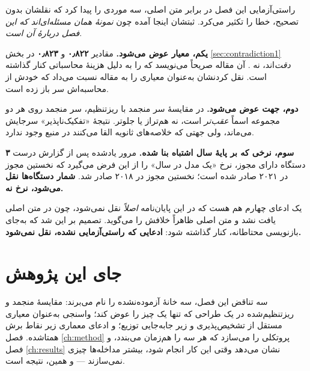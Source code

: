 راستی‌آزمایی این فصل در برابر متن اصلی، سه موردی را پیدا کرد که نقلشان بدون تصحیح، خطا را
تکثیر می‌کرد. ثبتشان اینجا آمده چون \emph{نمونهٔ همان مسئله‌ای‌اند که این فصل دربارهٔ آن است}.

\textbf{یکم، معیار عوض می‌شود.} مقادیر \textbf{\num{۰٫۸۲۲}} و \textbf{\num{۰٫۸۲۳}} در بخش
\ref{sec:contradiction1} \emph{دقت}‌اند، نه . آن مقاله صریحاً می‌نویسد که  را
به دلیل هزینهٔ محاسباتی کنار گذاشته است. نقل کردنشان به‌عنوان  معیاری را به مقاله
نسبت می‌داد که خودش از محاسبه‌اش سر باز زده است.

\textbf{دوم، جهت عوض می‌شود.} در مقایسهٔ سر منجمد با ریزتنظیم، سر منجمد روی هر دو مجموعه
اسماً \emph{عقب‌تر} است، نه هم‌تراز یا جلوتر. نتیجهٔ «تفکیک‌ناپذیر» سرجایش می‌ماند، ولی جهتی
که خلاصه‌های ثانویه القا می‌کنند در منبع وجود ندارد.

\textbf{سوم، نرخی که بر پایهٔ سال اشتباه بنا شده.} مرور یادشده پس از گزارش درست
\textbf{\num{۳}} دستگاه دارای مجوز، نرخ «یک مدل در سال» را از این فرض می‌گیرد که نخستین مجوز در
\num{۲۰۲۱} صادر شده است؛ نخستین مجوز در \num{۲۰۱۸} صادر شد. \textbf{شمار دستگاه‌ها نقل می‌شود، نرخ نه.}

یک ادعای چهارم هم هست که در این پایان‌نامه \emph{اصلاً} نقل نمی‌شود، چون در متن اصلی یافت نشد
و متن اصلی ظاهراً خلافش را می‌گوید. تصمیم بر این شد که به‌جای بازنویسی محتاطانه، کنار گذاشته
شود: \textbf{ادعایی که راستی‌آزمایی نشده، نقل نمی‌شود.}

\section{جای این پژوهش}

سه تناقض این فصل، سه خانهٔ آزموده‌نشده را نام می‌برند: مقایسهٔ منجمد و ریزتنظیم‌شده در یک
طراحی که تنها یک چیز را عوض کند؛ واسنجی به‌عنوان معیاری مستقل از تشخیص‌پذیری و زیر جابه‌جایی
توزیع؛ و ادعای معماری زیر نقاط برش همتاشده. فصل \ref{ch:method} پروتکلی را می‌سازد که هر سه
را هم‌زمان می‌بندد، و فصل \ref{ch:results} نشان می‌دهد وقتی این کار انجام شود، بیشتر
مداخله‌ها چیزی نمی‌سازند — و همین، نتیجه است.
